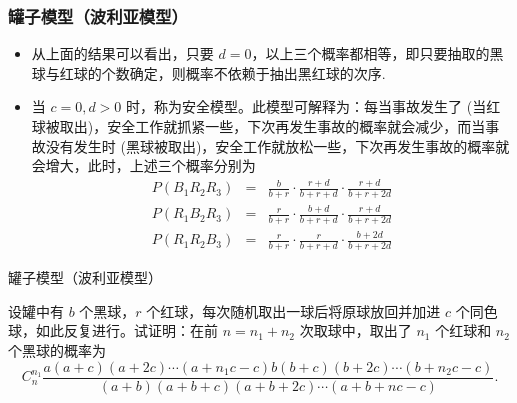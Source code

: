 \begin{frame}
	\frametitle{罐子模型（波利亚模型）}
	\begin{itemize}[<+-|alert@+>]
		\item 从上面的结果可以看出，只要 $d=0$，以上三个概率都相等，即只要抽取的黑球与红球的个数确定，则概率不依赖于抽出黑红球的次序.
		\item 当 $c=0,d>0$ 时，称为安全模型。此模型可解释为：每当事故发生了 (当红球被取出)，安全工作就抓紧一些，下次再发生事故的概率就会减少，而当事故没有发生时 (黑球被取出)，安全工作就放松一些，下次再发生事故的概率就会增大，此时，上述三个概率分别为
		{\small\begin{eqnarray*}
				P(B_1R_2R_3) &=&\frac{b}{b+r}\cdot\frac{r+d}{b+r+d}\cdot\frac{r+d}{b+r+2d}\\
				P(R_1B_2R_3)&=&\frac{r}{b+r}\cdot\frac{b+d}{b+r+d}\cdot\frac{r+d}{b+r+2d}\\
				P(R_1R_2B_3) &=&\frac{r}{b+r}\cdot\frac{r}{b+r+d}\cdot\frac{b+2d}{b+r+2d}
		\end{eqnarray*}}
	\end{itemize}

\end{frame}

\begin{frame}{罐子模型（波利亚模型）}
	\begin{exam}
	设罐中有 $b$ 个黑球，$r$ 个红球，每次随机取出一球后将原球放回并加进 $c$ 个同色球，如此反复进行。试证明：在前 $n=n_1+n_2$ 次取球中，取出了 $n_1$ 个红球和 $n_2$ 个黑球的概率为
		$$C_n^{n_1}\frac{a(a+c)(a+2c)\cdots(a+n_1c-c)b(b+c)(b+2c)\cdots(b+n_2c-c)}{(a+b)(a+b+c)(a+b+2c)\cdots(a+b+nc-c)}.$$
	\end{exam}
\end{frame}












